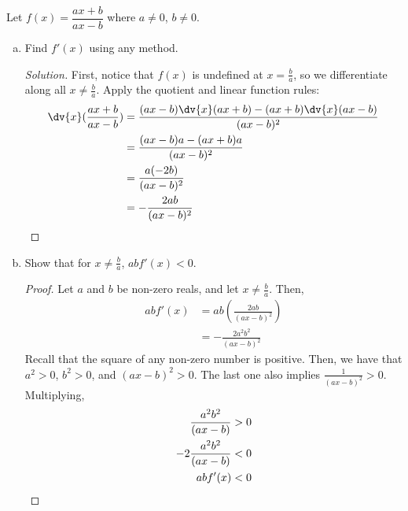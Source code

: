 \question Let $f(x)=\dfrac{ax+b}{ax-b}$ where $a \neq 0$, $b \neq 0$.
\begin{enumerate}[(a)]
  \item Find $f'(x)$ using any method.
        \begin{proof}[Solution]
          First, notice that $f(x)$ is undefined at $x=\frac{b}{a}$,
          so we differentiate along all $x \neq \frac{b}{a}$.
          Apply the quotient and linear function rules:
          \begin{align*}
            \dv{x}(\frac{ax+b}{ax-b})
             & = \frac{(ax-b)\dv{x}(ax+b) - (ax+b)\dv{x}(ax-b)}{(ax-b)^2} \\
             & = \frac{(ax-b)a - (ax+b)a}{(ax-b)^2}                       \\
             & = \frac{a(-2b)}{(ax-b)^2}                                  \\
             & = -\frac{2ab}{(ax-b)^2} \qedhere
          \end{align*}
        \end{proof}
  \item Show that for $x \neq \frac{b}{a}$, $abf'(x)<0$.
        \begin{proof}
          Let $a$ and $b$ be non-zero reals, and let $x \neq \frac{b}{a}$. Then,
          \begin{align*}
            abf'(x) & = ab\left(\frac{2ab}{(ax-b)^2}\right) \\
                    & = -\frac{2a^2b^2}{(ax-b)^2}
          \end{align*}
          Recall that the square of any non-zero number is positive.
          Then, we have that $a^2 > 0$, $b^2 > 0$, and $(ax-b)^2 > 0$.
          The last one also implies $\frac{1}{(ax-b)^2} > 0$. Multiplying,
          \begin{align*}
            \frac{a^2b^2}{(ax-b)}   & > 0          \\
            -2\frac{a^2b^2}{(ax-b)} & < 0          \\
            abf'(x)                 & < 0 \qedhere
          \end{align*}
        \end{proof}
\end{enumerate}


